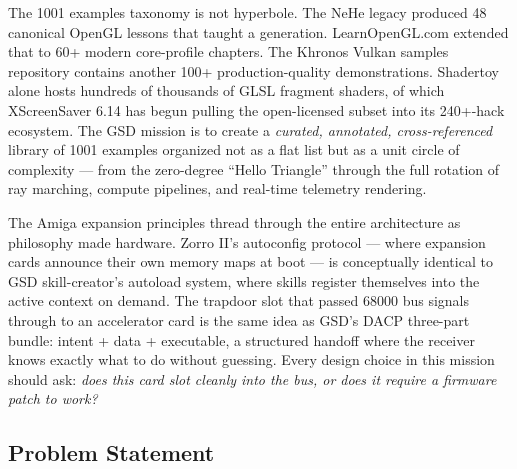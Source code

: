 \documentclass[11pt,letterpaper]{article}
\begin{document}
The 1001 examples taxonomy is not hyperbole. The NeHe legacy produced 48 canonical OpenGL lessons that taught a generation. LearnOpenGL.com extended that to 60+ modern core-profile chapters. The Khronos Vulkan samples repository contains another 100+ production-quality demonstrations. Shadertoy alone hosts hundreds of thousands of GLSL fragment shaders, of which XScreenSaver 6.14 has begun pulling the open-licensed subset into its 240+-hack ecosystem. The GSD mission is to create a \emph{curated, annotated, cross-referenced} library of 1001 examples organized not as a flat list but as a unit circle of complexity — from the zero-degree ``Hello Triangle'' through the full rotation of ray marching, compute pipelines, and real-time telemetry rendering.

The Amiga expansion principles thread through the entire architecture as philosophy made hardware. Zorro II's autoconfig protocol — where expansion cards announce their own memory maps at boot — is conceptually identical to GSD skill-creator's autoload system, where skills register themselves into the active context on demand. The trapdoor slot that passed 68000 bus signals through to an accelerator card is the same idea as GSD's DACP three-part bundle: intent + data + executable, a structured handoff where the receiver knows exactly what to do without guessing. Every design choice in this mission should ask: \emph{does this card slot cleanly into the bus, or does it require a firmware patch to work?}

\subsection{Problem Statement}
\end{document}
